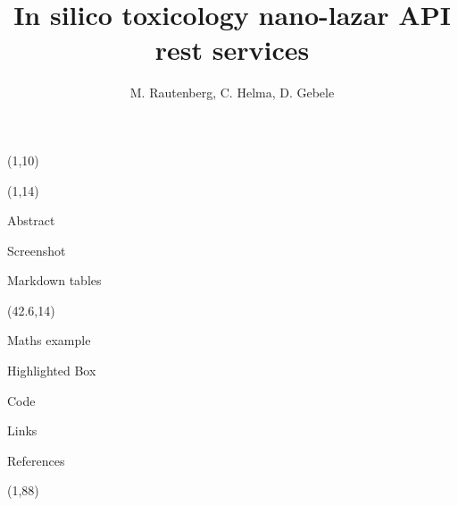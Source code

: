 \documentclass[final]{beamer}
\title{In silico toxicology nano-lazar API rest services}
\author{M. Rautenberg, C. Helma, D. Gebele}
\institute{\emph{in silico} toxicology gmbh, Basel, Switzerland}
\begin{document}
  \begin{frame}{}

    \begin{textblock}{80}(1,10)
        
    \end{textblock}

    \begin{textblock}{40.5}(1,14)
      \begin{block}{Abstract}
        
      \end{block}

      \begin{block}{Screenshot}
        
      \end{block}

      \begin{block}{Markdown tables}
        
      \end{block}

    \end{textblock}

    \begin{textblock}{40.5}(42.6,14)

      \begin{block}{Maths example}
        
      \end{block}

      \begin{alertblock}{Highlighted Box}
        
      \end{alertblock}

      \begin{block}{Code}
        
      \end{block}

      \begin{exampleblock}{Links}
        
      \end{exampleblock}

      \begin{block}{References}
        \small
      \end{block}

    \end{textblock}

    \begin{textblock}{82.1}(1,88)
      
    \end{textblock}

  \end{frame}
\end{document}

